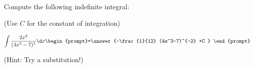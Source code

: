 \documentclass{ximera}
\author{Jim Talamo}
\begin{document}
\begin{exercise}
Compute the following indefinite integral:

\begin{prompt} (Use $C$ for the constant of integration) \end{prompt}

\[
\int \frac{2x^2}{(4x^3-7)^3} \d x 
\begin{prompt}=\answer{-\frac{1}{12} (4x^3-7)^{-2} +C } \end{prompt}
\]

(Hint: Try a substitution!)
\end{exercise}
\end{document}
